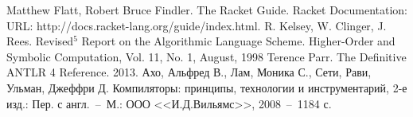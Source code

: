 \documentclass[12pt,a4paper,oneside]{extarticle}
\begin{document}
\begin{thebibliography}{0}
     Matthew Flatt, Robert Bruce Findler. The Racket Guide. Racket Documentation: URL: http://docs.racket-lang.org/guide/index.html.
     R. Kelsey, W. Clinger, J. Rees. Revised$^5$ Report on the Algorithmic Language Scheme. Higher-Order and Symbolic Computation, Vol. 11, No. 1, August, 1998
     Terence Parr. The Definitive ANTLR 4 Reference. 2013.
     Ахо, Альфред В., Лам, Моника С., Сети, Рави, Ульман, Джеффри Д. Компиляторы: принципы, технологии и инструментарий, 2-е изд.: Пер. с англ.~--~М.: ООО <<И.Д.Вильямс>>, 2008~--~1184 с.
        
\end{thebibliography}
\end{document}
